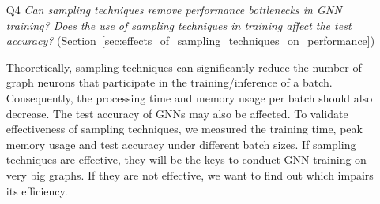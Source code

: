 \begin{itemize}
    \item[Q4] \emph{Can sampling techniques remove performance bottlenecks in GNN training? Does the use of sampling techniques in training affect the test accuracy?} (Section~\ref{sec:effects_of_sampling_techniques_on_performance})

          Theoretically, sampling techniques can significantly reduce the number of graph neurons that participate in the training/inference of a batch.
          Consequently, the processing time and memory usage per batch should also decrease.
          The test accuracy of GNNs may also be affected.
          To validate effectiveness of sampling techniques, we measured the training time, peak memory usage and test accuracy under different batch sizes.
          If sampling techniques are effective, they will be the keys to conduct GNN training on very big graphs.
          If they are not effective, we want to find out which impairs its efficiency.

\end{itemize}